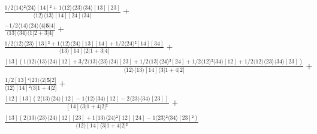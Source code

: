 \documentclass[varwidth, border=5pt]{standalone}
\begin{document}
\begin{my}
$\begin{gathered}
\scriptscriptstyle\frac{1/2⟨14⟩²⟨24⟩[14]²+1⟨12⟩⟨23⟩⟨34⟩[13][23]}{⟨12⟩⟨13⟩[14][24]⟨34⟩} +\\
\scriptscriptstyle\frac{-1/2⟨14⟩⟨24⟩⟨4|𝟓|4]}{⟨13⟩⟨34⟩⟨1|2+3|4]} +\\
\scriptscriptstyle\frac{1/2⟨12⟩⟨23⟩[13]²+1⟨12⟩⟨24⟩[13][14]+1/2⟨24⟩²[14][34]}{⟨13⟩[14]⟨2|1+3|4]} +\\
\scriptscriptstyle\frac{[13](1⟨12⟩⟨13⟩⟨24⟩[12]+3/2⟨13⟩⟨23⟩⟨24⟩[23]+1/2⟨13⟩⟨24⟩²[24]+1/2⟨12⟩²⟨34⟩[12]+1/2⟨12⟩⟨23⟩⟨34⟩[23])}{⟨12⟩⟨13⟩[14]⟨3|1+4|2]} +\\
\scriptscriptstyle\frac{1/2[13]²⟨23⟩⟨2|𝟓|2]}{⟨12⟩[14]²⟨3|1+4|2]} +\\
\scriptscriptstyle\frac{[12][13](2⟨13⟩⟨24⟩[12]-1⟨12⟩⟨34⟩[12]-2⟨23⟩⟨34⟩[23])}{[14]⟨3|1+4|2]²} +\\
\scriptscriptstyle\frac{[13](2⟨13⟩⟨23⟩⟨24⟩[12][23]+1⟨13⟩⟨24⟩²[12][24]-1⟨23⟩²⟨34⟩[23]²)}{⟨12⟩[14]⟨3|1+4|2]²} \phantom{+}
\end{gathered}$
\end{my}
\end{document}
